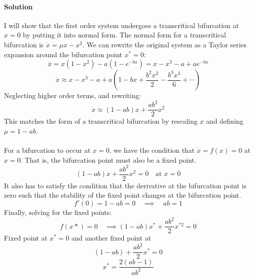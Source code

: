 \documentclass[11pt]{article}
\begin{document}
\paragraph{Solution}
I will show that the first order system undergoes a transcritical bifurcation at $x=0$ by putting it into normal form. The normal form for a transcritical bifurcation is $\dot{x} = \mu x - x^2$. We can rewrite the original system as a Taylor series expansion around the bifurcation point $x^*=0$:
\[\dot{x} = x(1-x^2) - a(1-e^{-bx})=x-x^3-a+ae^{-bx}\]
\[\dot{x}\approx x-x^3-a+a\left(1-bx+\frac{b^2x^2}{2}-\frac{b^3x^3}{6}+\cdots\right)\]
Neglecting higher order terms, and rewriting:
\[\dot{x}\approx (1-ab)x+\frac{ab^2}{2}x^2\]
This matches the form of a transcritical bifurcation by rescaling $x$ and defining $\mu = 1-ab$.\\\\
For a bifurcation to occur at $x=0$, we have the condition that $\dot{x} = f(x) = 0$ at $x=0$. That is, the bifurcation point must also be a fixed point.
\[(1-ab)x+\frac{ab^2}{2}x^2 = 0 \quad \text{at } x=0\]
It also has to satisfy the condition that the derivative at the bifurcation point is zero such that the stability of the fixed point changes at the bifurcation point.
\[f'(0) = 1-ab = 0 \quad \implies \quad \boxed{ab = 1}\]
Finally, solving for the fixed points:
\[f(x*) = 0 \quad \implies (1-ab)x^*+\frac{ab^2}{2}x^{*2} = 0\]
Fixed point at $\boxed{x^*=0}$ and another fixed point at
\[(1-ab)+\frac{ab^2}{2}x^{*} = 0\]
\[\boxed{x^* = \frac{2(ab-1)}{ab^2}}\]
\end{document}
